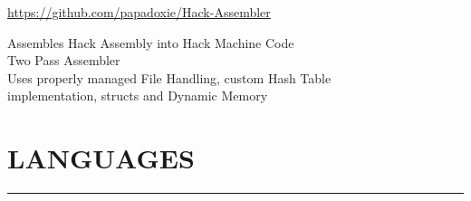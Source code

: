 \documentclass[]{resume}
\begin{document}
\begin{minipage}[t]{0.66\textwidth}
    \vspace{4pt}
     
    \href{https://github.com/papadoxie/Hack-Assembler}{https://github.com/papadoxie/Hack-Assembler}\\
    \vspace{4pt}
    \begin{minipage}{0.85\textwidth\vspace{2pt}}
        Assembles Hack Assembly into Hack Machine Code\\
        Two Pass Assembler\\
        Uses properly managed File Handling, custom Hash Table\\implementation, structs and Dynamic Memory
    \end{minipage}

\end{minipage}


%
%



%
%


\begin{minipage}[t]{0.265\textwidth}

    \vspace{26.5pt}


    \section{LANGUAGES}
    \noindent\rule{5 cm}{0.4pt}


    \vspace{2pt}
    
\end{minipage}


%
%
\end{document}
